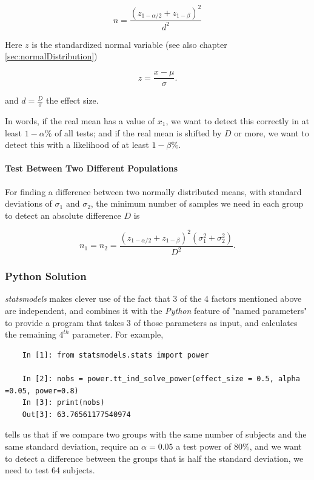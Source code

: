 \begin{equation}
  n = \frac{{({z_{1 - \alpha /2}} + {z_{1 - \beta }})}^2}{d^2}
\end{equation}

Here $z$ is the standardized normal variable (see also chapter \ref{sec:normalDistribution})

\begin{equation}
  z = \frac{x-\mu}{\sigma} .
\end{equation}

and $d = \frac{D}{\sigma}$ the effect size.

In words, if the real mean has a value of $x_1$, we want to detect this correctly in at least $1-\alpha\%$ of all tests; and if the real mean is shifted by $D$ or more, we want to detect this with a likelihood of at least $1-\beta\%$.

\paragraph{Test Between Two Different Populations}
For finding a difference between two normally distributed means, with standard deviations of $\sigma_1$ and $\sigma_2$, the minimum number of samples we need in each group to detect an absolute difference $D$ is

\begin{equation}
  {n_1} = {n_2} = \frac{{({z_{1 - \alpha /2}} + {z_{1 - \beta }})}^2(\sigma _1^2 + \sigma _2^2)}{D^2} .
\end{equation}

\subsubsection{Python Solution}

\emph{statsmodels} makes clever use of the fact that 3 of the 4 factors mentioned above are independent, and combines it with the \emph{Python} feature of "named parameters" to provide a program that takes 3 of those parameters as input, and calculates the remaining $4^{th}$ parameter. For example,

\begin{lstlisting}
    In [1]: from statsmodels.stats import power

    In [2]: nobs = power.tt_ind_solve_power(effect_size = 0.5, alpha =0.05, power=0.8)
    In [3]: print(nobs)
    Out[3]: 63.76561177540974
\end{lstlisting}

tells us that if we compare two groups with the same number of subjects and the same standard deviation, require an $\alpha=0.05$ a test power of $80\%$, and we want to detect a difference between the groups that is half the standard deviation, we need to test 64 subjects.

